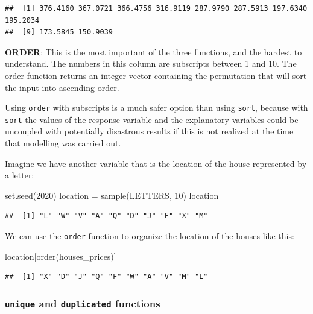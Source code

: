 \documentclass[
]{book}
\newenvironment{Shaded}{\begin{snugshade}}{\end{snugshade}}
\newcommand{\DecValTok}[1]{\textcolor[rgb]{0.00,0.00,0.81}{#1}}
\newcommand{\FunctionTok}[1]{\textcolor[rgb]{0.00,0.00,0.00}{#1}}
\newcommand{\NormalTok}[1]{#1}
\newcommand{\OtherTok}[1]{\textcolor[rgb]{0.56,0.35,0.01}{#1}}
\theoremstyle{definition}
\theoremstyle{definition}
\theoremstyle{definition}
\theoremstyle{definition}
\theoremstyle{remark}
\begin{document}
\begin{verbatim}
##  [1] 376.4160 367.0721 366.4756 316.9119 287.9790 287.5913 197.6340 195.2034
##  [9] 173.5845 150.9039
\end{verbatim}

\textbf{ORDER}: This is the most important of the three functions, and the hardest to understand. The numbers in this column are subscripts between 1 and 10. The order function returns an integer vector containing the permutation that will sort the input into ascending order.

Using \texttt{order} with subscripts is a much safer option than using \texttt{sort}, because with \texttt{sort} the values of the response variable and the explanatory variables could be uncoupled with potentially disastrous results if this is not realized at the time that modelling was carried out.

Imagine we have another variable that is the location of the house represented by a letter:

\begin{Shaded}
\begin{Highlighting}[]
\FunctionTok{set.seed}\NormalTok{(}\DecValTok{2020}\NormalTok{)}
\NormalTok{location }\OtherTok{=} \FunctionTok{sample}\NormalTok{(LETTERS, }\DecValTok{10}\NormalTok{)}
\NormalTok{location}
\end{Highlighting}
\end{Shaded}

\begin{verbatim}
##  [1] "L" "W" "V" "A" "Q" "D" "J" "F" "X" "M"
\end{verbatim}

We can use the \texttt{order} function to organize the location of the houses like this:

\begin{Shaded}
\begin{Highlighting}[]
\NormalTok{location[}\FunctionTok{order}\NormalTok{(houses\_prices)]}
\end{Highlighting}
\end{Shaded}

\begin{verbatim}
##  [1] "X" "D" "J" "Q" "F" "W" "A" "V" "M" "L"
\end{verbatim}

\hypertarget{unique-and-duplicated-functions}{%
\subsubsection{\texorpdfstring{\texttt{unique} and \texttt{duplicated} functions}{unique and duplicated functions}}\label{unique-and-duplicated-functions}}
\end{document}
